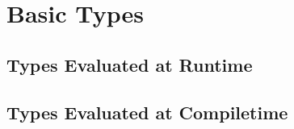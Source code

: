 
\chapter{Basic Types}



\section{Types Evaluated at Runtime}



\section{Types Evaluated at Compiletime}